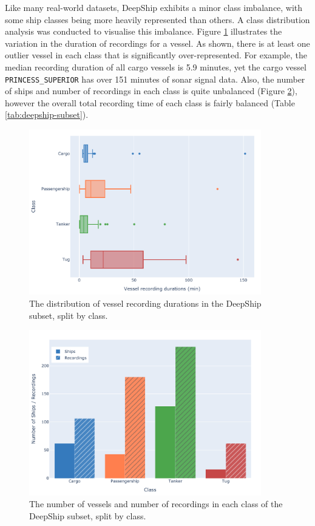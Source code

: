 Like many real-world datasets, DeepShip exhibits a minor class imbalance, with some ship classes being more heavily represented than others. A class distribution analysis was conducted to visualise this imbalance. Figure \ref{fig:deepship-subset-recording-length} illustrates the variation in the duration of recordings for a vessel. As shown, there is at least one outlier vessel in each class that is significantly over-represented. For example, the median recording duration of all cargo vessels is 5.9 minutes, yet the cargo vessel \texttt{PRINCESS\_SUPERIOR} has over 151 minutes of sonar signal data. Also, the number of ships and number of recordings in each class is quite unbalanced (Figure \ref{fig:deepship-subset-number-vessels}), however the overall total recording time of each class is fairly balanced (Table \ref{tab:deepship-subset}).

\begin{figure}[hp]
    \centering
    \includegraphics[width=0.90\textwidth]{img/ch3/deepship_figs/deepship_duration_spread.pdf}
    \caption{The distribution of vessel recording durations in the DeepShip subset, split by class.}
    \label{fig:deepship-subset-recording-length}
\end{figure}

\begin{figure}[hp]
    \centering
    \includegraphics[width=0.90\textwidth]{img/ch3/deepship_figs/deepship_class_analysis.pdf}
    \caption{The number of vessels and number of recordings in each class of the DeepShip subset, split by class.}
    \label{fig:deepship-subset-number-vessels}
\end{figure}

